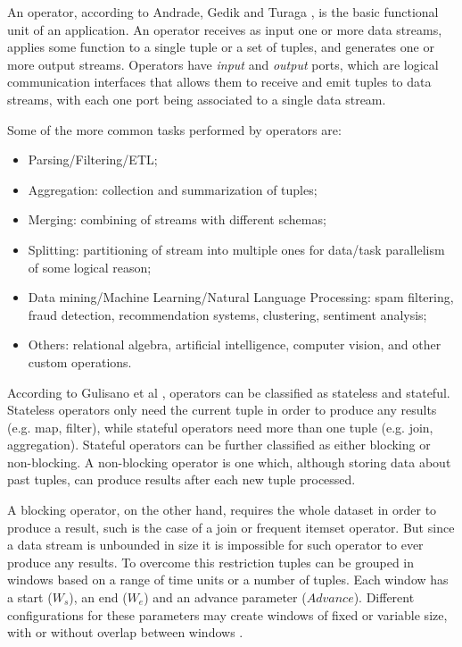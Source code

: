 \documentclass[ppgc,diss,english]{iiufrgs}
\begin{document}
An operator, according to Andrade, Gedik and Turaga \cite{andrade2014fundamentals}, is the basic functional unit of an application. An operator receives as input one or more data streams, applies some function to a single tuple or a set of tuples, and generates one or more output streams. Operators have \emph{input} and \emph{output} ports, which are logical communication interfaces that allows them to receive and emit tuples to data streams, with each one port being associated to a single data stream.

Some of the more common tasks performed by operators are:

\begin{itemize}
\item Parsing/Filtering/ETL;
\item Aggregation: collection and summarization of tuples;
\item Merging: combining of streams with different schemas;
\item Splitting: partitioning of stream into multiple ones for data/task parallelism of some logical reason;
\item Data mining/Machine Learning/Natural Language Processing: spam filtering, fraud detection, recommendation systems, clustering, sentiment analysis;
\item Others: relational algebra, artificial intelligence, computer vision, and other custom operations.
\end{itemize}

According to Gulisano et al \cite{gulisano2010streamcloud}, operators can be classified as stateless and stateful. Stateless operators only need the current tuple in order to produce any results (e.g. map, filter), while stateful operators need more than one tuple (e.g. join, aggregation). Stateful operators can be further classified as either blocking or non-blocking. A non-blocking operator is one which, although storing data about past tuples, can produce results after each new tuple processed.

A blocking operator, on the other hand, requires the whole dataset in order to produce a result, such is the case of a join or frequent itemset operator. But since a data stream is unbounded in size it is impossible for such operator to ever produce any results. To overcome this restriction tuples can be grouped in windows based on a range of time units or a number of tuples. Each window has a start ($W_s$), an end ($W_e$) and an advance parameter ($Advance$). Different configurations for these parameters may create windows of fixed or variable size, with or without overlap between windows \cite{gulisano2012streamcloud}.
\end{document}
